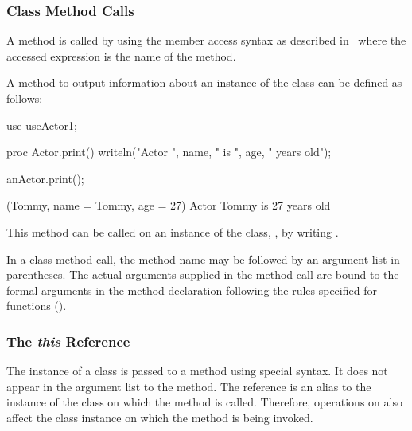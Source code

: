 \subsubsection{Class Method Calls}
\label{Class_Method_Calls}

A method is called by using the member access syntax as described
in~ where the accessed expression is
the name of the method.

\begin{example}
A method to output information about an instance of the 
class can be defined as follows:
\begin{chapelpre}
use useActor1;
\end{chapelpre}
\begin{chapel}
proc Actor.print() {
  writeln("Actor ", name, " is ", age, " years old");
}
\end{chapel}
\begin{chapelpost}
anActor.print();
\end{chapelpost}
\begin{chapeloutput}
(Tommy, {name = Tommy, age = 27})
Actor Tommy is 27 years old
\end{chapeloutput}
This method can be called on an instance of the 
class, , by writing .
\end{example}

In a class method call, the method name may be followed by an argument list in
parentheses.  The actual arguments supplied in the method call are bound to the
formal arguments in the method declaration following the rules specified for
functions ().

\subsubsection{The {\em this} Reference}
\label{The_em_this_Reference}

The instance of a class is passed to a method using special syntax.
It does not appear in the argument list to the method.  The
reference  is an alias to the instance of the class on
which the method is called.  Therefore, operations on  also affect
the class instance on which the method is being invoked.

